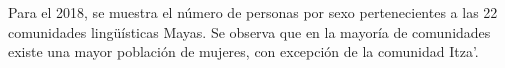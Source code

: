 Para el 2018, se muestra el número de personas por sexo pertenecientes a las 22 comunidades lingüísticas Mayas. Se observa que en la mayoría de comunidades existe una mayor población de mujeres, con excepción de la comunidad Itza’.